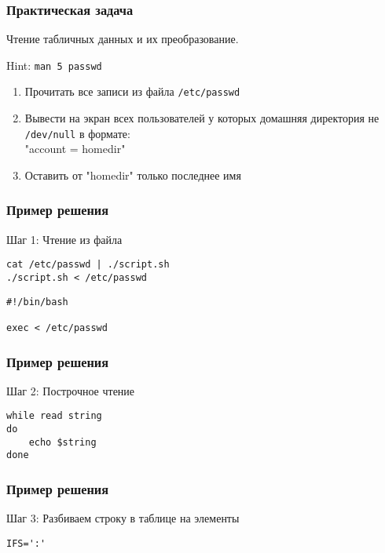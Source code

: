 
\begin{frame}[fragile]
	\frametitle{Практическая задача}

	Чтение табличных данных и их преобразование.

	\pause

	Hint: {\tt man 5 passwd}

	\begin{enumerate}
		\item Прочитать все записи из файла {\tt /etc/passwd}
		\item Вывести на экран всех пользователей у которых 
			домашняя директория не {\tt /dev/null} в формате:\\
			"account = homedir"
		\item Оставить от "homedir" только последнее имя
	\end{enumerate}
\end{frame}


\begin{frame}[fragile]
	\frametitle{Пример решения}

	\begin{block}{Шаг 1: Чтение из файла}

	\begin{lstlisting}
cat /etc/passwd | ./script.sh
./script.sh < /etc/passwd
	\end{lstlisting}

	\begin{lstlisting}
#!/bin/bash

exec < /etc/passwd
	\end{lstlisting}

	\end{block}
\end{frame}


\begin{frame}[fragile]
	\frametitle{Пример решения}

	\begin{block}{Шаг 2: Построчное чтение}

	\begin{lstlisting}
while read string
do
    echo $string
done
	\end{lstlisting}

	\end{block}
\end{frame}

\begin{frame}[fragile]
	\frametitle{Пример решения}

	\begin{block}{Шаг 3: Разбиваем строку в таблице на элементы}

	\begin{lstlisting}
IFS=':'
	\end{lstlisting}

	\end{block}
\end{frame}


